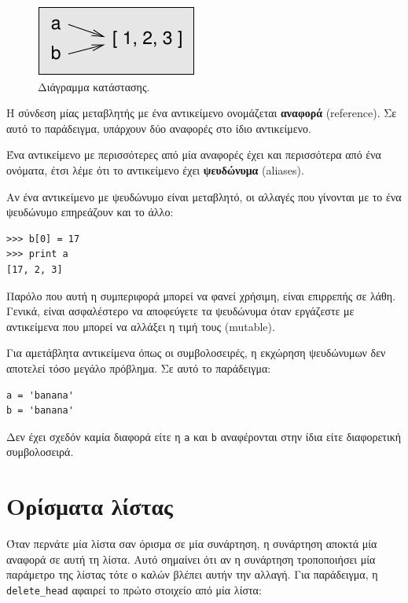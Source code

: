 \documentclass[10pt]{book}
\begin{document}
\begin{figure}
\centerline
{\includegraphics[scale=0.8]{figs/list3.pdf}}
 \caption{Διάγραμμα κατάστασης.} 
\label{fig.list3}
\end{figure}

 
Η σύνδεση μίας μεταβλητής με ένα αντικείμενο ονομάζεται {\bf αναφορά} (reference). Σε αυτό το παράδειγμα, υπάρχουν δύο αναφορές στο ίδιο αντικείμενο.

Ένα αντικείμενο με περισσότερες από μία αναφορές έχει και περισσότερα από ένα ονόματα, έτσι λέμε ότι το αντικείμενο έχει {\bf ψευδώνυμα} (aliases).
 
Αν ένα αντικείμενο με ψευδώνυμο είναι μεταβλητό, οι αλλαγές που γίνονται με το ένα ψευδώνυμο επηρεάζουν και το άλλο:

\begin{verbatim}
>>> b[0] = 17
>>> print a
[17, 2, 3]
\end{verbatim}
%
 
Παρόλο που αυτή η συμπεριφορά μπορεί να φανεί χρήσιμη, είναι επιρρεπής σε λάθη. Γενικά, είναι ασφαλέστερο να αποφεύγετε τα ψευδώνυμα όταν εργάζεστε με αντικείμενα που μπορεί να αλλάξει η τιμή τους (mutable).  

Για αμετάβλητα αντικείμενα όπως οι συμβολοσειρές, η εκχώρηση ψευδώνυμων δεν αποτελεί τόσο μεγάλο πρόβλημα. Σε αυτό το παράδειγμα:

\begin{verbatim}
a = 'banana'
b = 'banana'
\end{verbatim}
%

Δεν έχει σχεδόν καμία διαφορά είτε η {\tt a} και {\tt b} αναφέρονται στην ίδια είτε διαφορετική συμβολοσειρά.


\section{Ορίσματα λίστας}
\label{list.arguments}

Όταν περνάτε μία λίστα σαν όρισμα σε μία συνάρτηση, η συνάρτηση αποκτά μία αναφορά σε αυτή τη λίστα. Αυτό σημαίνει ότι αν η συνάρτηση τροποποιήσει μία παράμετρο της λίστας τότε ο καλών βλέπει αυτήν την αλλαγή. Για παράδειγμα, η \verb"delete_head" αφαιρεί το πρώτο στοιχείο από μία λίστα:
\end{document}
